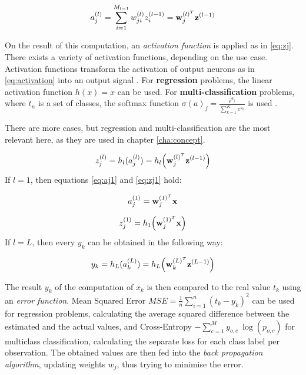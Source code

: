 \begin{equation}\label{eq:activation}
	a_j^{(l)} = \sum_{i=1}^{M_{l-1}}w_{ji}^{(l)}z_i^{(l-1)} = \bold{w}_j^{(l)^T} \bold{z}^{(l-1)}	
\end{equation}

On the result of this computation, an \textit{activation function} is applied as in \ref{eq:zj}. There exists a variety of activation functions, depending on the use case. Activation functions transform the activation of output neurons as in \ref{eq:activation} into an output signal \cite{sibi2013analysis}. For \textbf{regression} problems, the linear activation function $h(x)=x$ can be used. For \textbf{multi-classification} problems, where $t_n$ is a set of classes, the softmax function $\sigma(a)_j= \frac{e^{a_j}}{\sum_{k=1}^Ke^{a_k}}$ is used \cite{hallmachinelearning}.

There are more cases, but regression and multi-classification are the most relevant here, as they are used in chapter \ref{cha:concept}.

\begin{equation} \label{eq:zj}
	z_j^{(l)} = h_l(a_j^{(l)}) = h_l\Big(\bold{w}_j^{(l)^T} \bold{z}^{(l-1)}\Big)	
\end{equation}
If $l=1$, then equations \ref{eq:aj1} and \ref{eq:zj1} hold:

\begin{equation} \label{eq:aj1}
	a_j^{(1)}=\bold{w}_j^{(1)^T}\bold{x}
\end{equation}

\begin{equation} \label{eq:zj1}
	z_j^{(1)}=h_1\Big(\bold{w}_j^{(1)^T}\bold{x}\Big)
\end{equation}
If $l=L$, then every $y_k$ can be obtained in the following way:

\begin{equation}
	y_k = h_L(a_k^{(L)}) = h_L\Big( \bold{w}_k^{(L)^T} \bold{z}^{(L-1)} \Big)
\end{equation}

The result $y_k$ of the computation of $x_k$ is then compared to the real value $t_k$ using an \textit{error function}. Mean Squared Error $MSE = \frac{1}{n} \sum_{i=1}^n (t_k-y_k)^2$ can be used for regression problems, calculating the average squared difference between the estimated and the actual values, and Cross-Entropy $-\sum_{c=1}^My_{o,c} \: \log(p_{o,c})$ for multiclass classification, calculating the separate loss for each class label per observation. The obtained values are then fed into the \textit{back propagation algorithm}, updating weights $w_j$, thus trying to minimise the error. 


